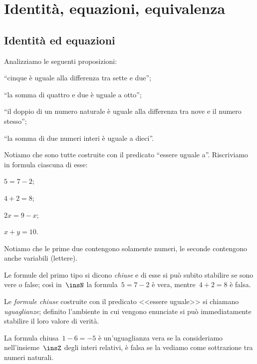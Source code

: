 \chapter{Identità, equazioni, equivalenza}
\section{Identità ed equazioni}

Analizziamo le seguenti proposizioni:

\begin{enumeratea}
\item ``cinque è uguale alla differenza tra sette e due'';
\item ``la somma di quattro e due è uguale a otto'';
\item ``il doppio di un numero naturale è uguale alla differenza tra nove e il numero stesso'';
\item ``la somma di due numeri interi è uguale a dieci''.
\end{enumeratea}

Notiamo che sono tutte costruite con il predicato
``essere uguale a''. Riscriviamo in formula ciascuna di esse:
\begin{multicols}{4}
 \begin{enumeratea}
\item $5=7-2$;
\item $4+2=8$;
\item $2x=9-x$;
\item $x+y=10$.
\end{enumeratea}
\end{multicols}
Notiamo che le prime due contengono solamente numeri, le seconde
contengono anche variabili (lettere).

Le formule del primo tipo si dicono \emph{chiuse} e
di esse si può subito stabilire se sono vere o false; così in~$\insN$ la
formula~$5 = 7 - 2$ è vera, mentre~$4 + 2 = 8$ è falsa.

\begin{definizione}
 Le \emph{formule chiuse} costruite con il predicato
<<essere uguale>> si chiamano \emph{uguaglianze};
definito l'ambiente in cui vengono enunciate si può
immediatamente stabilire il loro valore di verità.
\end{definizione}

\begin{exrig}
 \begin{esempio}
 La formula chiusa~$1 - 6 = -5$ è un'uguaglianza
vera se la consideriamo nell'insieme~$\insZ$ degli interi
relativi, è falsa se la vediamo come sottrazione tra numeri naturali.
 \end{esempio}
\end{exrig}

